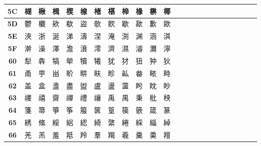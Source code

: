 \begin{table}[H]
{\begin{tabular}{|Sc|Sc|Sc|Sc|Sc|Sc|Sc|Sc|Sc|Sc|Sc|Sc|}
\textbf{5C} & 楜 & 楸 & 楫 & 楔 & 楾 & 楮 & 椹 & 楴 & 椽 & 楙 & 椰 \\ \hline
\textbf{5D} & 鬱 & 欟 & 欸 & 欷 & 盜 & 欹 & 飮 & 歇 & 歃 & 歉 & 歐 \\ \hline
\textbf{5E} & 浹 & 浙 & 涎 & 涕 & 濤 & 涅 & 淹 & 渕 & 渊 & 涵 & 淇 \\ \hline
\textbf{5F} & 澣 & 澡 & 澤 & 澹 & 濆 & 澪 & 濟 & 濕 & 濬 & 濔 & 濘 \\ \hline
\textbf{60} & 犁 & 犇 & 犒 & 犖 & 犢 & 犧 & 犹 & 犲 & 狃 & 狆 & 狄 \\ \hline
\textbf{61} & 甬 & 甼 & 畄 & 畍 & 畊 & 畉 & 畛 & 畆 & 畚 & 畩 & 畤 \\ \hline
\textbf{62} & 盖 & 盒 & 盞 & 盡 & 盥 & 盧 & 盪 & 蘯 & 盻 & 眈 & 眇 \\ \hline
\textbf{63} & 禝 & 禧 & 齋 & 禪 & 禮 & 禳 & 禹 & 禺 & 秉 & 秕 & 秧 \\ \hline
\textbf{64} & 箋 & 箒 & 箏 & 筝 & 箙 & 篋 & 篁 & 篌 & 篏 & 箴 & 篆 \\ \hline
\textbf{65} & 綉 & 絛 & 綏 & 絽 & 綛 & 綺 & 綮 & 綣 & 綵 & 緇 & 綽 \\ \hline
\textbf{66} & 羌 & 羔 & 羞 & 羝 & 羚 & 羣 & 羯 & 羲 & 羹 & 羮 & 羶 \\ \hline
\end{tabular}
}
\end{table}

